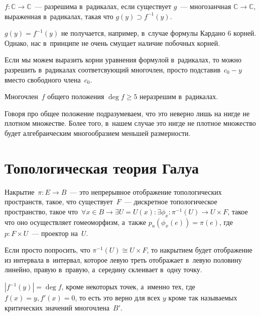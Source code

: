 \documentclass{article}
\begin{document}
\begin{definition}
	$f: \mathbb{C} \rightarrow \mathbb{C}$~--- разрешима в~радикалах, если
	существует $g$~--- многозанчная $\mathbb{C} \rightarrow \mathbb{C}$,
	выраженная в~радикалах, такая что $g(y) \supset f^{-1}(y)$.
\end{definition}

\begin{remark}
	$g(y) = f^{-1}(y)$ не получается, например, в~случае формулы Кардано 6 корней.
	Однако, нас в~принципе не очень смущает наличие побочных корней.
\end{remark}

Если мы можем выразить корни уравнения формулой в~радикалах, то можно разрешить
в~радикалах соответсвующий многочлен, просто подставив~$c_0 - y$ вместо
свободного члена~$c_0$.

\begin{theorem}
	Многочлен~$f$ общего положения $\deg f \ge 5$ неразрешим в~радикалах.
\end{theorem}

Говоря про общее положение подразумеваем, что это неверно лишь на нигде не
плотном множестве. Более того, в~нашем случае это нигде не плотное множество
будет алгебраическим многообразием меньшей размерности.

\section{Топологическая теория Галуа}

\begin{definition}[Накрытие]
	Накрытие~$\pi: E \rightarrow B$~--- это непрерывное отображение топологических
	пространств, такое, что существует~$F$~--- дискретное топологическое
	пространство, такое что~$\forall x \in B \rightarrow \exists U = U(x):
	\exists \phi_x: \pi^{-1}(U) \rightarrow U \times F$, такое что оно
	осуществляет гомеоморфизм, а~также $p_u(\phi_x(e)) = \pi(e)$, где $p: F \times
	U$~--- проектор на~$U$.
\end{definition}

\begin{remark}
	Если просто попросить, что $\pi^{-1}(U) \cong U \times F$, то накрытием будет
	отображение из интервала в~интервал, которое левую треть отображает в~левую
	половину линейно, правую в~правую, а~середину склеивает в~одну точку.
\end{remark}

$|f^{-1}(y)| = \deg f$, кроме некоторых точек, а~именно тех, где $f(x) = y,
f'(x) = 0$, то есть это верно для всех $y$ кроме так называемых критических
значений многочлена~$B'$.
\end{document}
